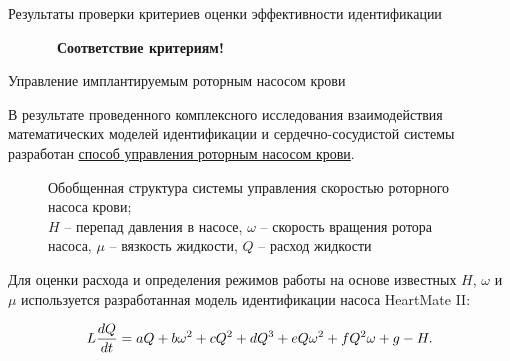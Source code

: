 \documentclass[a4paper, 9pt]{beamer}
\begin{document}
\begin{frame}{Результаты проверки критериев оценки эффективности идентификации}
\begin{minipage}[ht]{0.42\textwidth}
\vskip-2pt
\centering~~~~~~~\large \bf \textcolor{green!70}{Соответствие критериям!}

\end{minipage}

\end{frame}


\begin{frame}{Управление имплантируемым роторным насосом крови}
\scriptsize

В результате проведенного комплексного исследования взаимодействия математических моделей идентификации и сердечно-сосудистой системы разработан \underline{способ управления роторным насосом крови}. %

\begin{minipage}[ht]{0.49\textwidth}
\begin{figure}
\caption{\scriptsize Обобщенная структура системы управления скоростью роторного насоса крови; \tiny \\$H$ -- перепад давления в насосе, $\omega$ -- скорость вращения ротора насоса, $\mu$ -- вязкость жидкости, $Q$ -- расход жидкости} %
\end{figure}

\scriptsize \vskip-5pt
Для оценки расхода и определения режимов работы на основе известных $H$, $\omega$ и $\mu$ используется разработанная модель идентификации насоса HeartMate II:

\vskip-10pt
\begin{equation}
	\setcounter{equation}{1}
	L\frac{dQ}{dt} = aQ + b\omega^2 + cQ^2 + dQ^3 + eQ\omega^2 + fQ^2\omega + g - H.
\end{equation}


\end{minipage}
\end{frame}
\end{document}
